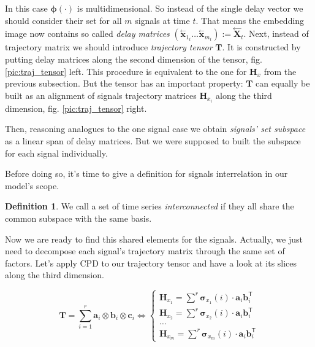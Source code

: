 \documentclass[referee, pdflatex, sn-mathphys-num]{sn-jnl}
\theoremstyle{definition}
\newtheorem*{Def}{Definition}
\theoremstyle{plain}
\newcommand{\delayV}[1]{\overset{\leftarrow}{\mathbf{x}}_{#1}}
\newcommand{\delayM}[1]{\overset{\leftarrow}{\mathbf{X}}_{#1}}
\begin{document}
	In this case $ \boldsymbol{\phi}(\cdot) $ is multidimensional. So instead of the single delay vector we should consider their set for all $ m $ signals at time $ t $. That means the embedding image now contains so called \emph{delay matrices} $ ( \delayV{1_t} \ldots \delayV{m_t} ) := \delayM{t} $. Next, instead of trajectory matrix we should introduce \textit{trajectory tensor} $ \mathbf{T} $. It is constructed  by putting delay matrices along the second dimension of the tensor, fig. \ref{pic:traj_tensor} left. This procedure is equivalent to the one for $ \mathbf{H}_x $ from the previous subsection. But the tensor has an important property: $ \mathbf{T} $ can equally be built as an alignment of signals trajectory matrices $ \mathbf{H}_{x_i} $ along the third dimension, fig. \ref{pic:traj_tensor} right.
	
	Then, reasoning analogues to the one signal case we obtain \emph{signals' set subspace} as a linear span of delay matrices. But we were supposed to built the subspace for each signal individually.
	
	Before doing so, it's time to give a definition for signals interrelation in our model's scope.
	
	\begin{Def}		
		We call a set of time series \emph{interconnected} if they all share the common subspace with the same basis.
	\end{Def}
	
	Now we are ready to find this shared elements for the signals. Actually, we just need to decompose each signal's trajectory matrix through the same set of factors. Let's apply CPD to our trajectory tensor and have a look at its slices along the third dimension.
	
	\begin{equation}\label{eq:tSSA_decomp}
		\mathbf{T} = \sum\limits_{i = 1}^{r} \mathbf{a}_i \otimes \mathbf{b}_i \otimes \mathbf{c}_i \Leftrightarrow \begin{cases}
			\mathbf{H}_{x_1} = \sum\limits^{r} \boldsymbol{\sigma}_{x_1}(i) \cdot \mathbf{a}_i  \mathbf{b}_i^{\mathsf{T}}  \\
			\mathbf{H}_{x_2} = \sum\limits^{r} \boldsymbol{\sigma}_{x_2}(i) \cdot \mathbf{a}_i  \mathbf{b}_i^{\mathsf{T}} \\
			\ldots \\
			\mathbf{H}_{x_m} = \sum\limits^{r} \boldsymbol{\sigma}_{x_m}(i) \cdot \mathbf{a}_i  \mathbf{b}_i^{\mathsf{T}} 
		\end{cases}
	\end{equation}
	
\end{document}
